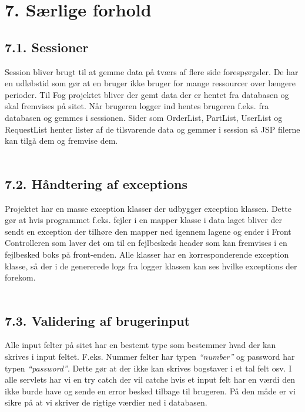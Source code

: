 \documentclass[11pt]{report}
\begin{document}
\chapter*{7. Særlige forhold}

\section*{7.1. Sessioner}
Session bliver brugt til at gemme data på tværs af flere side
forespørgsler. De har en udløbstid som gør at en bruger ikke bruger
for mange ressourcer over længere perioder. Til Fog projektet bliver
der gemt data der er hentet fra databasen og skal fremvises på
sitet. Når brugeren logger ind hentes brugeren f.eks. fra databasen og
gemmes i sessionen. Sider som OrderList, PartList, UserList og
RequestList henter lister af de tilsvarende data og gemmer i session
så JSP filerne kan tilgå dem og fremvise dem. \\\\

\section*{7.2. Håndtering af exceptions}
Projektet har en masse exception klasser der udbygger exception klassen. Dette gør at hvis programmet f.eks. fejler i en mapper klasse i data laget bliver der sendt en exception der tilhøre den mapper ned igennem lagene og ender i Front Controlleren som laver det om til en fejlbeskeds header som kan fremvises i en fejlbesked boks på front-enden. Alle klasser har en korresponderende exception klasse, så der i de genererede logs fra logger klassen kan ses hvilke exceptions der forekom. \\\\

\section*{7.3. Validering af brugerinput}
Alle input felter på sitet har en bestemt type som bestemmer hvad der
kan skrives i input feltet. F.eks. Nummer felter har typen
\textit{“number”} og password har typen \textit{“password”}. Dette gør
at der ikke kan skrives bogstaver i et tal felt osv. I alle servlets
har vi en try catch der vil catche hvis et input felt har en værdi den
ikke burde have og sende en error besked tilbage til brugeren. På den
måde er vi sikre på at vi skriver de rigtige værdier ned i databasen.
\newpage
\end{document}
